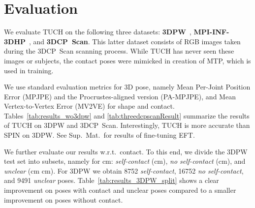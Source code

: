 \documentclass[final]{cvpr}
\newcommand{\suppmat}{Sup.~Mat.\xspace}
\newcommand{\threedcpscan}{\mbox{3DCP Scan}\xspace}
\newcommand{\threedpw}{\mbox{3DPW}\xspace}
\theoremstyle{definition}
\begin{document}
\section{Evaluation}
\begin{table}[t]
	\centering
	\caption{Evaluation on \threedcpscan.
	Numbers are in \emph{mm}. Note that in contrast to TUCH, this version of SPIN did not see poses in the MTP dataset during training. Please see Table \ref{tab:ablation_study} and the corresponding text for an ablation study.}
	\label{tab:threedcpscanResult}
\end{table}
We  evaluate TUCH  on the following three datasets:
\textbf{3DPW}~\cite{vonMarcard2018}, \textbf{MPI-INF-3DHP}~\cite{mono-3dhp2017},
and \textbf{\threedcpscan}. 
This latter dataset consists of RGB images taken during the \threedcpscan scanning process.
While TUCH has never seen these images or subjects, the contact poses were mimicked in creation of MTP, which is used in training.

We use standard evaluation metrics for 3D pose, namely Mean Per-Joint
Position Error (MPJPE) and the Procrustes-aligned version (PA-MPJPE),
and Mean Vertex-to-Vertex Error (MV2VE) for shape and contact. 
Tables~\ref{tab:results_wo3dpw} and \ref{tab:threedcpscanResult} summarize the results of TUCH on \threedpw and \threedcpscan.
Interestingly, TUCH is more accurate than SPIN on 3DPW.
See \suppmat~for results of fine-tuning EFT.

We further evaluate our results w.r.t.~contact. 
To this end, we divide the 3DPW test set into subsets, namely for
cm: \textit{self-contact} (cm), \textit{no
  self-contact} (cm), and \textit{unclear} (cm cm). For 3DPW we obtain 8752 \textit{self-contact}, 16752
\textit{no self-contact}, and 9491 \textit{unclear} poses. 
Table~\ref{tab:results_3DPW_split} shows a clear improvement on poses
with contact and unclear poses compared to a smaller improvement on
poses without contact.
\end{document}
